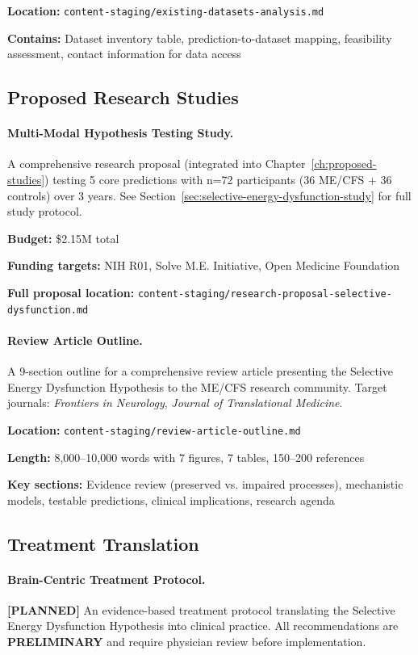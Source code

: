 \textbf{Location:} \texttt{content-staging/existing-datasets-analysis.md}

\textbf{Contains:} Dataset inventory table, prediction-to-dataset mapping, feasibility assessment, contact information for data access

\subsection{Proposed Research Studies}

\paragraph{Multi-Modal Hypothesis Testing Study.}
A comprehensive research proposal (integrated into Chapter~\ref{ch:proposed-studies}) testing 5 core predictions with n=72 participants (36 ME/CFS + 36 controls) over 3 years. See Section~\ref{sec:selective-energy-dysfunction-study} for full study protocol.

\textbf{Budget:} \$2.15M total

\textbf{Funding targets:} NIH R01, Solve M.E. Initiative, Open Medicine Foundation

\textbf{Full proposal location:} \texttt{content-staging/research-proposal-selective-dysfunction.md}

\paragraph{Review Article Outline.}
A 9-section outline for a comprehensive review article presenting the Selective Energy Dysfunction Hypothesis to the ME/CFS research community. Target journals: \emph{Frontiers in Neurology}, \emph{Journal of Translational Medicine}.

\textbf{Location:} \texttt{content-staging/review-article-outline.md}

\textbf{Length:} 8,000--10,000 words with 7 figures, 7 tables, 150--200 references

\textbf{Key sections:} Evidence review (preserved vs. impaired processes), mechanistic models, testable predictions, clinical implications, research agenda

\subsection{Treatment Translation}

\paragraph{Brain-Centric Treatment Protocol.}
\textbf{[PLANNED]} An evidence-based treatment protocol translating the Selective Energy Dysfunction Hypothesis into clinical practice. All recommendations are \textbf{PRELIMINARY} and require physician review before implementation.

